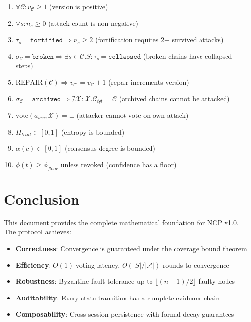\documentclass[11pt,a4paper]{article}
\begin{document}
\begin{enumerate}[label=\textbf{I\arabic*}]
    \item $\forall \mathcal{C}: v_\mathcal{C} \geq 1$ (version is positive)
    \item $\forall s: n_s \geq 0$ (attack count is non-negative)
    \item $\tau_s = \texttt{fortified} \Rightarrow n_s \geq 2$ (fortification requires 2+ survived attacks)
    \item $\sigma_\mathcal{C} = \texttt{broken} \Rightarrow \exists s \in \mathcal{C}.S: \tau_s = \texttt{collapsed}$ (broken chains have collapsed steps)
    \item $\text{REPAIR}(\mathcal{C}) \Rightarrow v_{\mathcal{C}'} = v_\mathcal{C} + 1$ (repair increments version)
    \item $\sigma_\mathcal{C} = \texttt{archived} \Rightarrow \nexists \mathcal{X}: \mathcal{X}.\mathcal{C}_{tgt} = \mathcal{C}$ (archived chains cannot be attacked)
    \item $\text{vote}(a_{src}, \mathcal{X}) = \bot$ (attacker cannot vote on own attack)
    \item $H_{total} \in [0, 1]$ (entropy is bounded)
    \item $\alpha(c) \in [0, 1]$ (consensus degree is bounded)
    \item $\phi(t) \geq \phi_{floor}$ unless revoked (confidence has a floor)
\end{enumerate}

\section{Conclusion}

This document provides the complete mathematical foundation for NCP v1.0. The protocol achieves:
\begin{itemize}
    \item \textbf{Correctness}: Convergence is guaranteed under the coverage bound theorem
    \item \textbf{Efficiency}: $O(1)$ voting latency, $O(|S|/|\mathcal{A}|)$ rounds to convergence
    \item \textbf{Robustness}: Byzantine fault tolerance up to $\lfloor (n-1)/2 \rfloor$ faulty nodes
    \item \textbf{Auditability}: Every state transition has a complete evidence chain
    \item \textbf{Composability}: Cross-session persistence with formal decay guarantees
\end{itemize}
\end{document}
